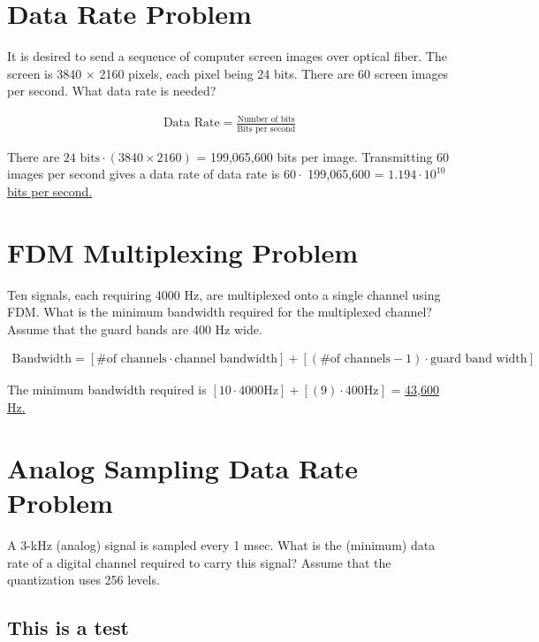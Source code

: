 
\section{Data Rate Problem}
It is desired to send a sequence of computer screen images over optical fiber. The screen is 3840 $\times$ 2160 pixels, each pixel being 24 bits. There are 60 screen images per second. What data rate is needed?

\begin{align*}
	\text{Data Rate} = \frac{\text{Number of bits}}{\text{Bits per second}}
\end{align*}
\vspace{4pt}

There are $24 \text{ bits} \cdot (3840 \times 2160)$ = 199,065,600 bits per image. Transmitting 60 images per second gives a data rate of data rate is $60 \cdot $ 199,065,600 = \ul{$1.194 \cdot 10^{10}$ bits per second.}

\section{FDM Multiplexing Problem}
Ten signals, each requiring 4000 Hz, are multiplexed onto a single channel using FDM. What is the minimum bandwidth required for the multiplexed channel? Assume that the guard bands are 400 Hz wide.

\begin{align*}
	\text{Bandwidth} = [\text{\# of channels} \cdot \text{channel bandwidth}] + [(\text{\# of channels} - 1) \cdot \text{guard band width}]
\end{align*}
\vspace{4pt}

The minimum bandwidth required is $[10 \cdot 4000 \text{Hz}] + [(9) \cdot 400 \text{Hz}]$ = \ul{43,600 Hz.}

\section{Analog Sampling Data Rate Problem}
A 3-kHz (analog) signal is sampled every 1 msec. What is the (minimum) data rate of a digital channel required to carry this signal? Assume that the quantization uses 256 levels.

\subsection{This is a test}

\section{}
\section{}
\section{}
\section{}

\raggedbottom
